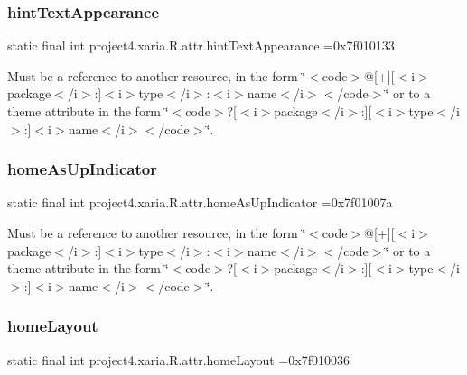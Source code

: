 \subsubsection{\texorpdfstring{hint\+Text\+Appearance}{hintTextAppearance}}
{\footnotesize\ttfamily static final int project4.\+xaria.\+R.\+attr.\+hint\+Text\+Appearance =0x7f010133\hspace{0.3cm}{\ttfamily [static]}}

Must be a reference to another resource, in the form \char`\"{}$<$code$>$@\mbox{[}+\mbox{]}\mbox{[}$<$i$>$package$<$/i$>$\+:\mbox{]}$<$i$>$type$<$/i$>$\+:$<$i$>$name$<$/i$>$$<$/code$>$\char`\"{} or to a theme attribute in the form \char`\"{}$<$code$>$?\mbox{[}$<$i$>$package$<$/i$>$\+:\mbox{]}\mbox{[}$<$i$>$type$<$/i$>$\+:\mbox{]}$<$i$>$name$<$/i$>$$<$/code$>$\char`\"{}. \mbox{\label{classproject4_1_1xaria_1_1R_1_1attr_a46850cc7c3b0341705d20f3130605f45}} 
\subsubsection{\texorpdfstring{home\+As\+Up\+Indicator}{homeAsUpIndicator}}
{\footnotesize\ttfamily static final int project4.\+xaria.\+R.\+attr.\+home\+As\+Up\+Indicator =0x7f01007a\hspace{0.3cm}{\ttfamily [static]}}

Must be a reference to another resource, in the form \char`\"{}$<$code$>$@\mbox{[}+\mbox{]}\mbox{[}$<$i$>$package$<$/i$>$\+:\mbox{]}$<$i$>$type$<$/i$>$\+:$<$i$>$name$<$/i$>$$<$/code$>$\char`\"{} or to a theme attribute in the form \char`\"{}$<$code$>$?\mbox{[}$<$i$>$package$<$/i$>$\+:\mbox{]}\mbox{[}$<$i$>$type$<$/i$>$\+:\mbox{]}$<$i$>$name$<$/i$>$$<$/code$>$\char`\"{}. \mbox{\label{classproject4_1_1xaria_1_1R_1_1attr_a96e373568d9179927f31cc06468cd1a4}} 
\subsubsection{\texorpdfstring{home\+Layout}{homeLayout}}
{\footnotesize\ttfamily static final int project4.\+xaria.\+R.\+attr.\+home\+Layout =0x7f010036\hspace{0.3cm}{\ttfamily [static]}}

